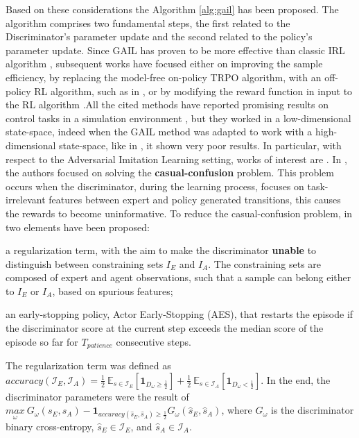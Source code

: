 Based on these considerations the Algorithm \ref{alg:gail} has been proposed. The algorithm comprises two fundamental steps, the first related to the Discriminator's parameter update and the second related to the policy's parameter update. Since GAIL has proven to be more effective than classic IRL algorithm \cite{ziebart2008maximum_entropy}, subsequent works have focused either on improving the sample efficiency, by replacing the model-free on-policy TRPO algorithm, with an off-policy RL algorithm, such as in \cite{kostrikov2018discriminator}, or by modifying the reward function in input to the RL algorithm \cite{fu2018airl,ghasemipour2020divergence_minimization_perspective}.All the cited methods have reported promising results on control tasks in a simulation environment \cite{brockman2016openai}, but they worked in a low-dimensional state-space, indeed when the GAIL method was adapted to work with a high-dimensional state-space, like in \cite{liu2018imitation_from_observation,reddy2019sqil,zolna2021task_relevant_ail,rafailov2021visual_ail}, it shown very poor results. In particular, with respect to the Adversarial Imitation Learning setting, works of interest are \cite{zolna2021task_relevant_ail,rafailov2021visual_ail}. In \cite{zolna2021task_relevant_ail}, the authors focused on solving the \textbf{casual-confusion} problem. This problem occurs when the discriminator, during the learning process, focuses on task-irrelevant features between expert and policy generated transitions, this causes the rewards to become uninformative. To reduce the casual-confusion problem, in \cite{zolna2021task_relevant_ail} two elements have been proposed: \begin{enumerate*}[label=(\textbf{\arabic*})]
    \item a regularization term, with the aim to make the discriminator \textbf{unable} to distinguish between constraining sets $I_{E}$ and $I_{A}$. The constraining sets are composed of expert and agent observations, such that a sample can belong either to $I_{E}$ or $I_{A}$, based on spurious features;
    \item an early-stopping policy, Actor Early-Stopping (AES), that restarts the episode if the discriminator score at the current step exceeds the median score of the episode so far for $T_{patience}$ consecutive steps.
\end{enumerate*} The regularization term was defined as $\textit{accuracy}(\mathcal{I}_{E}, \mathcal{I}_{A}) = \frac{1}{2} \ \mathbb{E}_{s \in \mathcal{I}_{E}} \left[ \mathbf{1}_{D_{\omega} \geq  \frac{1}{2}}\right] + \frac{1}{2} \ \mathbb{E}_{s \in \mathcal{I}_{A}} \left[ \mathbf{1}_{D_{\omega} <  \frac{1}{2}}\right]$. In the end, the discriminator parameters were the result of $\underset{\omega}{max} \ G_{\omega}(s_{E},s_{A}) - \mathbf{1}_{\textit{accuracy}(\hat{s}_{E},\hat{s}_{A}) \geq \frac{1}{2}} G_{\omega}(\hat{s}_{E},\hat{s}_{A})$, where $G_{\omega}$ is the discriminator binary cross-entropy, $\hat{s}_{E} \in \mathcal{I}_{E}$, and $\hat{s}_{A} \in \mathcal{I}_{A}$. %
